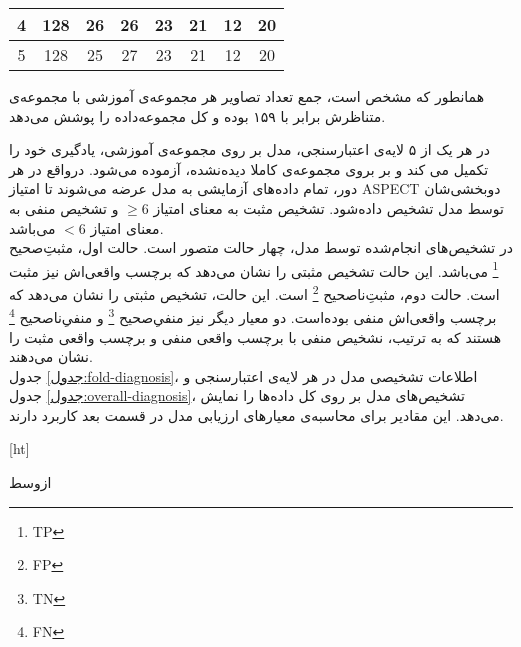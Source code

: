 \begin{tabular}{cc|cccccc|}
    \multicolumn{1}{|c|}{4}                                    & 128                                    & \multicolumn{1}{c|}{26}                         & \multicolumn{1}{c|}{26}                        & \multicolumn{1}{c|}{23}                        & \multicolumn{1}{c|}{21}                        & \multicolumn{1}{c|}{12}                        & 20  \\ \hline
    \multicolumn{1}{|c|}{5}                                    & 128                                    & \multicolumn{1}{c|}{25}                         & \multicolumn{1}{c|}{27}                        & \multicolumn{1}{c|}{23}                        & \multicolumn{1}{c|}{21}                        & \multicolumn{1}{c|}{12}                        & 20  \\ \hline
    \end{tabular}


همانطور که مشخص است، جمع تعداد تصاویر هر مجموعه‌ی آموزشی با مجموعه‌ی متناظرش برابر با ۱۵۹ بوده و کل مجموعه‌داده را پوشش می‌دهد.

در هر یک از ۵ لایه‌ی اعتبارسنجی، مدل بر روی مجموعه‌ی آموزشی، یادگیری خود را تکمیل می کند و بر بروی
 مجموعه‌ی کاملا دیده‌نشده، آزموده می‌شود.
 درواقع در هر دور، تمام داده‌های آزمایشی به مدل عرضه می‌شوند تا امتیاز ASPECT دو‌بخشی‌شان توسط مدل تشخیص داده‌شود.
تشخیص مثبت به معنای امتیاز $\geq 6$ و تشخیص منفی به معنای امتیاز $<6$ می‌باشد.\\

در تشخیص‌های انجام‌شده توسط مدل، چهار حالت متصور است.
حالت اول، مثبتِ‌صحیح
\footnote{TP}
می‌باشد.
این حالت تشخیص مثبتی را نشان می‌دهد که برچسب واقعی‌اش نیز مثبت است.
حالت دوم، مثبتِ‌ناصحیح
\footnote{FP}
است.
این حالت، تشخیص مثبتی را نشان می‌دهد که برچسب واقعی‌اش منفی بوده‌است.
دو معیار دیگر نیز منفیِ‌صحیح
\footnote{TN}
و منفیِ‌ناصحیح
\footnote{FN}
هستند که به ترتیب، نشخیص منفی با برچسب واقعی منفی و برچسب واقعی مثبت را نشان می‌دهند.\\

جدول \ref{جدول:fold-diagnosis}، اطلاعات تشخیصی مدل در
هر لایه‌ی اعتبارسنجی و جدول \ref{جدول:overall-diagnosis}،
تشخیص‌های مدل بر روی کل داده‌ها را نمایش می‌دهد.
این مقادیر برای محاسبه‌ی معیار‌های ارزیابی مدل در قسمت بعد کاربرد دارند.

[ht]

\vspace{1.5em}

‌ازوسط

